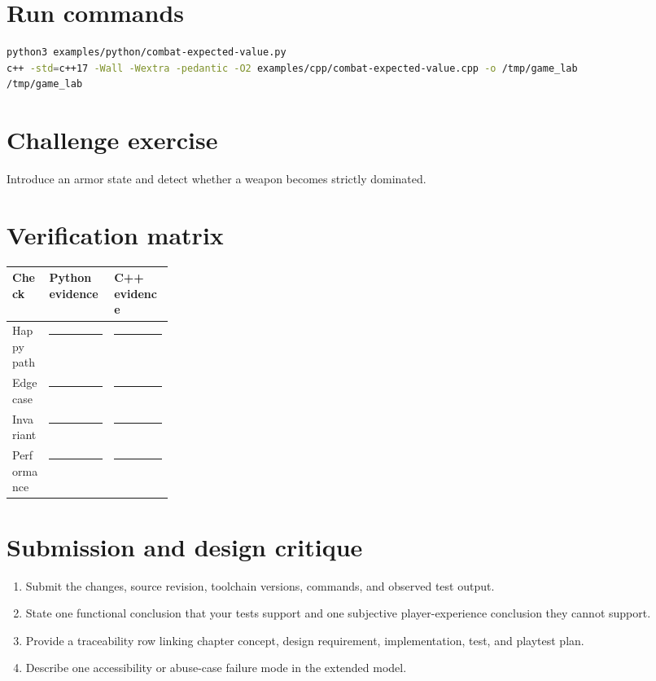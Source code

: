 \documentclass[11pt]{article}
\begin{document}
\section{Run commands}
\begin{lstlisting}[language=bash]
python3 examples/python/combat-expected-value.py
c++ -std=c++17 -Wall -Wextra -pedantic -O2 examples/cpp/combat-expected-value.cpp -o /tmp/game_lab
/tmp/game_lab
\end{lstlisting}

\section{Challenge exercise}
Introduce an armor state and detect whether a weapon becomes strictly dominated.


\section{Verification matrix}
\begin{tabularx}{\linewidth}{@{}p{0.23\linewidth}X X@{}}\toprule Check & Python evidence & C++ evidence\\\midrule
Happy path & \rule{0.85\linewidth}{0.4pt} & \rule{0.85\linewidth}{0.4pt}\\[0.35cm]
Edge case & \rule{0.85\linewidth}{0.4pt} & \rule{0.85\linewidth}{0.4pt}\\[0.35cm]
Invariant & \rule{0.85\linewidth}{0.4pt} & \rule{0.85\linewidth}{0.4pt}\\[0.35cm]
Performance & \rule{0.85\linewidth}{0.4pt} & \rule{0.85\linewidth}{0.4pt}\\\bottomrule\end{tabularx}

\section{Submission and design critique}
\begin{enumerate}
\item Submit the changes, source revision, toolchain versions, commands, and observed test output.
\item State one functional conclusion that your tests support and one subjective player-experience conclusion they cannot support.
\item Provide a traceability row linking chapter concept, design requirement, implementation, test, and playtest plan.
\item Describe one accessibility or abuse-case failure mode in the extended model.
\end{enumerate}
\end{document}
